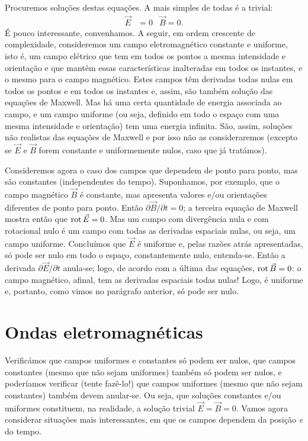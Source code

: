 Procuremos soluções destas equações. A mais simples de todas é a trivial:
\begin{align*}
  \vec E&=0&\vec B=0.
\end{align*}
É pouco interessante, convenhamos. A seguir, em ordem crescente de complexidade,
consideremos um campo eletromagnético constante e uniforme, isto é, um campo
elétrico que tem em todos os pontos a mesma intensidade e orientação e que
mantêm essas características inalteradas em todos os instantes, e o mesmo para o
campo magnético. Estes campos têm derivadas todas nulas em todos os pontos e em
todos os instantes e, assim, são também solução das equações de Maxwell. Mas há
uma certa quantidade de energia associada ao campo, e um campo uniforme (ou
seja, definido em todo o espaço com uma mesma intensidade e orientação) tem uma
energia infinita. São, assim, soluções não realistas das equações de
Maxwell e por isso não as consideraremos (excepto se $\vec E$ e $\vec B$ forem
constante e uniformemente nulos, caso que já tratámos). 

Consideremos agora o caso dos campos que dependem de ponto para ponto, mas são
constantes (independentes do tempo). Suponhamos, por exemplo, que o campo
magnético $\vec B$ é constante, mas apresenta valores e/ou orientações
diferentes de ponto para ponto. Então $\partial \vec B/\partial t=0$; a terceira
equação de Maxwell mostra então que $\rot \vec E=0$. Mas um campo com
divergência nula e com rotacional nulo é um campo com todas as derivadas
espaciais nulas, ou seja, um campo uniforme. Concluímos que $\vec E$ é uniforme
e, pelas razões atrás apresentadas, só pode ser nulo em todo o espaço,
constantemente nulo, entenda-se. Então a derivada $\partial \vec E/\partial t$
anula-se; logo, de acordo com a última das equações, $\rot \vec B=0$: o campo
magnético, afinal, tem as derivadas espaciais todas nulas! Logo, é uniforme e,
portanto, como vimos no parágrafo anterior, só pode ser nulo.

\section{Ondas eletromagnéticas}
Verificámos que campos uniformes e constantes só podem ser nulos, que campos
constantes (mesmo que não sejam uniformes) também só podem ser nulos, e
poderíamos verificar (tente fazê\-\mbox{-lo}!) que campos uniformes (mesmo que não sejam
constantes) também devem anular-se. Ou seja, que soluções constantes e/ou
uniformes constituem, na realidade, a solução trivial $\vec E=\vec B=0$.
Vamos agora considerar situações mais interessantes, em que os campos dependem da
posição \emph{e} do tempo.

